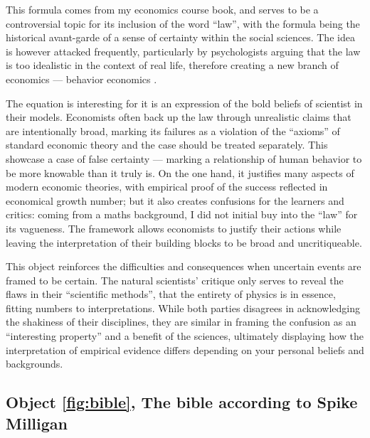 \documentclass[a4paper,12pt]{article}
\begin{document}
This formula comes from my economics course book, and serves to be a controversial topic for its inclusion of the word ``law'', with the formula being the historical avant-garde of a sense of certainty within the social sciences. The idea is however attacked frequently, particularly by psychologists arguing that the law is too idealistic in the context of real life, therefore creating a new branch of economics --- behavior economics \parencite{DKahneman}.

The equation is interesting for it is an expression of the bold beliefs of scientist in their models. Economists often back up the law through unrealistic claims that are intentionally broad, marking its failures as a violation of the ``axioms'' of standard economic theory and the case should be treated separately. This showcase a case of false certainty --- marking a relationship of human behavior to be more knowable than it truly is. On the one hand, it justifies many aspects of modern economic theories, with empirical proof of the success reflected in economical growth number; but it also creates confusions for the learners and critics: coming from a maths background, I did not initial buy into the ``law'' for its vagueness. The framework allows economists to justify their actions while leaving the interpretation of their building blocks to be broad and uncritiqueable.

This object reinforces the difficulties and consequences when uncertain events are framed to be certain. The natural scientists' critique only serves to reveal the flaws in their ``scientific methods'', that the entirety of physics is in essence, fitting numbers to interpretations. While both parties disagrees in acknowledging the shakiness of their disciplines, they are similar in framing the confusion as an ``interesting property'' and a benefit of the sciences, ultimately displaying how the interpretation of empirical evidence differs depending on your personal beliefs and backgrounds.

\subsection*{Object \ref{fig:bible}, The bible according to Spike Milligan}
\end{document}
